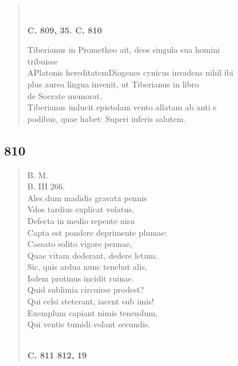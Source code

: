 \documentclass[11pt, a4paper]{report}
\begin{document}
\begin{verse}
        ﻿\pagebreak 
     \marginpar{[298]} \begin{center} \textbf{C. 809, 35. C. 810} \end{center}Tiberianus in Prometheo ait, deos singula sua homini \\ tribuisse \\ APlatonis hereditatemDiogenes cynicus invadens nihil ibi \\ plus aurea lingua invenit, ut Tiberianus in libro \\ de Socrate memorat. \\ Tiberianus inducit epistolam vento allatam ab anti s \\ podibus, quae habet: Superi inferis salutem. \\ 
      \end{verse}
  
            \subsection*{810}
      \begin{verse}
      B. M. \\ B. III 266. \\ Ales dum madidis gravata pennis \\ Vdos tardius explicat volatus, \\ Defecta in medio repente nisu \\ Capta est pondere deprimente plumae: \\ Cassato solito vigore pennae, \\ Quae vitam dederant, dedere letum. \\ Sic, quis ardua nunc tenebat alis, \\ Isdem protinus incidit ruinae. \\ Quid sublimia circuisse prodest? \\ Qui celsi steterant, iacent sub imis! \\ Exemplum capiant nimis tenendum, \\ Qui ventis tumidi volant secundis. \\ 
        ﻿\pagebreak 
     \marginpar{[299]} \begin{center} \textbf{C. 811 812, 19} \end{center}
      \end{verse}
  
\end{document}
